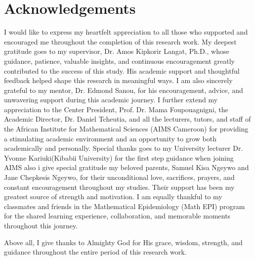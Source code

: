 \chapter*{Acknowledgements}


I would like to express my heartfelt appreciation to all those who supported and encouraged me throughout the completion of this research work. My deepest gratitude goes to my supervisor, Dr. Amos Kipkorir Langat, Ph.D., whose guidance, patience, valuable insights, and continuous encouragement greatly contributed to the success of this study. His academic support and thoughtful feedback helped shape this research in meaningful ways. I am also sincerely grateful to my mentor, Dr. Edmond Sanou, for his encouragement, advice, and unwavering support during this academic journey. I further extend my appreciation to the Center President, Prof. Dr. Mama Foupouagnigni, the Academic Director, Dr. Daniel Tcheutia, and all the lecturers, tutors, and staff of the African Institute for Mathematical Sciences (AIMS Cameroon) for providing a stimulating academic environment and an opportunity to grow both academically and personally. Special thanks goes to my University lecturer Dr. Yvonne Kariuki(Kibabii University) for the first step guidance when joining AIMS also i give special gratitude my beloved parents, Samuel Kisa Ngeywo and Jane Chepkesis Ngeywo, for their unconditional love, sacrifices, prayers, and constant encouragement throughout my studies. Their support has been my greatest source of strength and motivation. I am equally thankful to my classmates and friends in the Mathematical Epidemiology (Math EPI) program for the shared learning experience, collaboration, and memorable moments throughout this journey.

Above all, I give thanks to Almighty God for His grace, wisdom, strength, and guidance throughout the entire period of this research work.